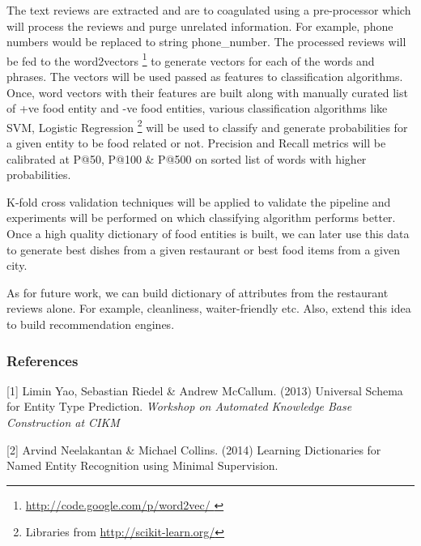 \documentclass{article} %
\begin{document}
The text reviews are extracted and are to coagulated using a pre-processor which will process the reviews and purge unrelated information. For example, phone numbers would be replaced to string phone\_number. The processed reviews will be fed to the word2vectors \footnote{ \url{http://code.google.com/p/word2vec/ } } to generate vectors for each of the words and phrases. The vectors will be used passed as features to classification algorithms. Once, word vectors with their features are built along with manually curated list of +ve food entity and -ve food entities, various classification algorithms like SVM, Logistic Regression \footnote{ Libraries from \url{http://scikit-learn.org/}} will be used to classify and generate probabilities for a given entity to be food related or not. Precision and Recall metrics will be calibrated at P@50, P@100 \& P@500 on sorted list of words with higher probabilities.

K-fold cross validation techniques will be applied to validate the pipeline and experiments will be performed on which classifying algorithm performs better. Once a high quality dictionary of food entities is built, we can later use this data to generate best dishes from a given restaurant or best food items from a given city.

As for future work, we can build dictionary of attributes from the restaurant reviews alone. For example, cleanliness, waiter-friendly etc. Also, extend this idea to build recommendation engines. 

\subsubsection*{References}


\small{
[1] Limin Yao, Sebastian Riedel \& Andrew McCallum. (2013) 
Universal Schema for Entity Type Prediction. 
{\it Workshop on Automated Knowledge Base Construction at CIKM }

[2] Arvind Neelakantan \& Michael Collins. (2014)
Learning Dictionaries for Named Entity Recognition using Minimal Supervision. 
}
\end{document}

